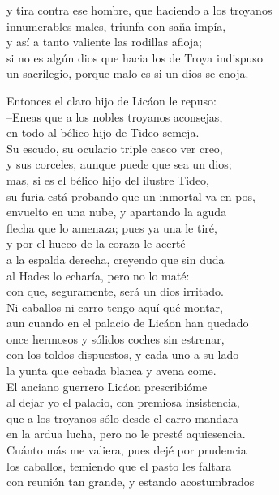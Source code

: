 y tira contra ese hombre, que haciendo a los troyanos\\
innumerables males, triunfa con saña impía,\\
y así a tanto valiente las rodillas afloja;\\
si no es algún dios que hacia los de Troya indispuso\\
un sacrilegio, porque malo es si un dios se enoja.\par
Entonces el claro hijo de Licáon le repuso:\\
--Eneas que a los nobles troyanos aconsejas,\\
en todo al bélico hijo de Tideo semeja.\\
Su escudo, su oculario triple casco ver creo,\\
y sus corceles, aunque puede que sea un dios;\\
mas, si es el bélico hijo del ilustre Tideo,\\
su furia está probando que un inmortal va en pos,\\
envuelto en una nube, y apartando la aguda\\
flecha que lo amenaza; pues ya una le tiré,\\
y por el hueco de la coraza le acerté\\
a la espalda derecha, creyendo que sin duda\\
al Hades lo echaría, pero no lo maté:\\
con que, seguramente, será un dios irritado.\\
Ni caballos ni carro tengo aquí qué montar,\\
aun cuando en el palacio de Licáon han quedado\\
once hermosos y sólidos coches sin estrenar,\\
con los toldos dispuestos, y cada uno a su lado\\
la yunta que cebada blanca y avena come.\\
El anciano guerrero Licáon prescribióme\\
al dejar yo el palacio, con premiosa insistencia,\\
que a los troyanos sólo desde el carro mandara\\
en la ardua lucha, pero no le presté aquiesencia.\\
Cuánto más me valiera, pues dejé por prudencia\\
los caballos, temiendo que el pasto les faltara\\
con reunión tan grande, y estando acostumbrados\\
